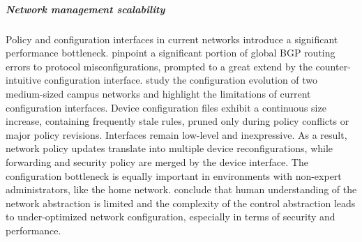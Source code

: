 
\subparagraph{Network management scalability}

Policy and configuration interfaces in current networks introduce a significant
performance bottleneck.   pinpoint a significant portion of
global BGP routing errors to protocol misconfigurations, prompted to a great
extend by the counter-intuitive configuration interface.   study the
configuration evolution of two medium-sized campus networks and highlight the
limitations of current configuration interfaces.  Device configuration files
exhibit a continuous size increase, containing frequently stale rules, pruned
only during policy conflicts or major policy revisions.  Interfaces remain
low-level and inexpressive. As a result, network policy updates translate into
multiple device reconfigurations, while forwarding and security policy are
merged by the device interface. The configuration bottleneck is equally
important in environments with non-expert administrators, like the home network.
 conclude that human understanding of the network abstraction is
limited and the complexity of the control abstraction leads to under-optimized
network configuration, especially  in terms of security and performance. 

